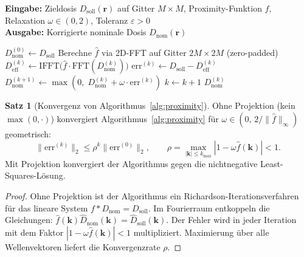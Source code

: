 ﻿\documentclass[a4paper,12pt]{article}
\theoremstyle{definition}
\newtheorem{satz}{Satz}[section]
\newcommand{\ordre}[1]{\mathcal{O}\!\left(#1\right)}
\newcommand{\vect}[1]{\bm{#1}}
\begin{document}
	\begin{algorithm}[htb]
		\caption{Iterative Proximity-Effekt-Korrektur (IPEC)}
		\label{alg:proximity}
		\textbf{Eingabe:} Zieldosis $D_\mathrm{soll}(\vect{r})$ auf Gitter
		$M\times M$, Proximity-Funktion $f$, Relaxation $\omega \in (0, 2)$,
		Toleranz $\varepsilon > 0$\\
		\textbf{Ausgabe:} Korrigierte nominale Dosis $D_\mathrm{nom}(\vect{r})$
		\begin{algorithmic}[1]
			\State $D_\mathrm{nom}^{(0)} \gets D_\mathrm{soll}$ 
			\State Berechne $\hat{f}$ via 2D-FFT auf Gitter $2M\times 2M$ (zero-padded)
			\Repeat
			\State $D_\mathrm{eff}^{(k)} \gets \mathrm{IFFT}\bigl(\hat{f} \cdot
			\mathrm{FFT}(D_\mathrm{nom}^{(k)})\bigr)$ \Comment{Faltung via FFT, $\ordre{M^2\log M}$}
			\State $\mathrm{err}^{(k)} \gets D_\mathrm{soll} - D_\mathrm{eff}^{(k)}$
			\State $D_\mathrm{nom}^{(k+1)} \gets \max\!\left(0,\;
			D_\mathrm{nom}^{(k)} + \omega\cdot\mathrm{err}^{(k)}\right)$
			\State $k \gets k + 1$
			\State \Return $D_\mathrm{nom}^{(k)}$
		\end{algorithmic}
	\end{algorithm}
	
	\begin{satz}[Konvergenz von Algorithmus~\ref{alg:proximity}]
		\label{satz:ipec-konvergenz}
		Ohne Projektion (kein $\max(0,\cdot)$) konvergiert Algorithmus~\ref{alg:proximity}
		für $\omega \in (0,\, 2/\|\hat{f}\|_\infty)$ geometrisch:
		\begin{equation}
			\|\mathrm{err}^{(k)}\|_2 \leq \rho^k \|\mathrm{err}^{(0)}\|_2,
			\qquad \rho = \max_{|\vect{k}| \leq k_\mathrm{max}} |1 - \omega\hat{f}(\vect{k})| < 1.
			\label{eq:ipec-konvergenz}
		\end{equation}
		Mit Projektion konvergiert der Algorithmus gegen die nichtnegative Least-Squares-Lösung.
	\end{satz}
	
	\begin{proof}
		Ohne Projektion ist der Algorithmus ein Richardson-Iterationsverfahren
		für das lineare System $f * D_\mathrm{nom} = D_\mathrm{soll}$.
		Im Fourierraum entkoppeln die Gleichungen: $\hat{f}(\vect{k})\hat{D}_\mathrm{nom}(\vect{k}) = \hat{D}_\mathrm{soll}(\vect{k})$.
		Der Fehler wird in jeder Iteration mit dem Faktor $|1-\omega\hat{f}(\vect{k})| < 1$
		multipliziert. Maximierung über alle Wellenvektoren liefert die Konvergenzrate $\rho$.
	\end{proof}
	
\end{document}
